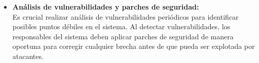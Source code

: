 \documentclass[12pt,a4paper,oneside]{report}
\begin{document}
\begin{itemize}
{  }El control de acceso basado en roles (RBAC) es una estrategia que permite definir diferentes niveles de acceso a las funciones del sistema en función del rol de cada usuario. Esto ayuda a minimizar el riesgo de errores humanos y previene el acceso no autorizado a funciones críticas del sistema semafórico.
\item
  \textbf{Análisis de vulnerabilidades y parches de seguridad:}\\
  Es crucial realizar análisis de vulnerabilidades periódicos para identificar posibles puntos débiles en el sistema. Al detectar vulnerabilidades, los responsables del sistema deben aplicar parches de seguridad de manera oportuna para corregir cualquier brecha antes de que pueda ser explotada por atacantes.
\end{itemize}

\label{tbl:2.3}
\end{document}
